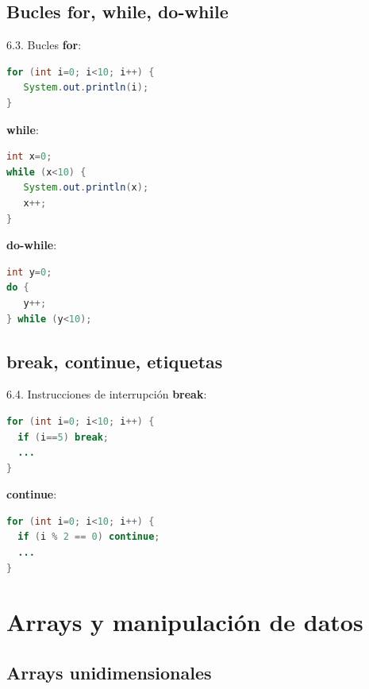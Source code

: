 \documentclass{beamer}
\begin{document}
\subsection{Bucles for, while, do-while}

\begin{frame}[fragile]{6.3. Bucles}
\textbf{for}:
\begin{lstlisting}[language=Java]
for (int i=0; i<10; i++) {
   System.out.println(i);
}
\end{lstlisting}

\textbf{while}:
\begin{lstlisting}[language=Java]
int x=0;
while (x<10) {
   System.out.println(x);
   x++;
}
\end{lstlisting}

\textbf{do-while}:
\begin{lstlisting}[language=Java]
int y=0;
do {
   y++;
} while (y<10);
\end{lstlisting}
\end{frame}

\subsection{break, continue, etiquetas}

\begin{frame}[fragile]{6.4. Instrucciones de interrupción}
\textbf{break}:
\begin{lstlisting}[language=Java]
for (int i=0; i<10; i++) {
  if (i==5) break; 
  ...
}
\end{lstlisting}

\textbf{continue}:
\begin{lstlisting}[language=Java]
for (int i=0; i<10; i++) {
  if (i % 2 == 0) continue;
  ...
}
\end{lstlisting}

\end{frame}

\section{Arrays y manipulación de datos}

\subsection{Arrays unidimensionales}
\end{document}
